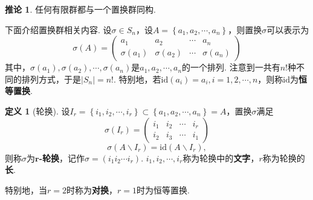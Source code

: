 \documentclass[12pt]{ctexart}
\theoremstyle{definition}
\newtheorem{definition}{定义}
\newtheorem{corollary}{推论}
\theoremstyle{plain}
\newcommand{\id}{\mathrm{id}}
\begin{document}
	\begin{corollary}
		任何有限群都与一个置换群同构.
	\end{corollary}
	下面介绍置换群相关内容. 设$\sigma\in S_n$，设$A=\left\{a_1,a_2,\cdots,a_n\right\}$，则置换$\sigma$可以表示为
	$$\sigma(A)=
	\begin{pmatrix}
		a_1 & a_2 & \cdots & a_n \\
		\sigma(a_1) & \sigma(a_2) & \cdots & \sigma(a_n)
	\end{pmatrix}
	$$
	其中，$\sigma(a_1),\sigma(a_2),\cdots,\sigma(a_n)$是$a_1,a_2,\cdots,a_n$的一个排列. 注意到一共有$n!$种不同的排列方式，于是$|S_n|=n!$. 特别地，若$\id(a_i)=a_i,i=1,2,\cdots,n$，则称$\id$为\textbf{恒等置换}.
	\begin{definition}[轮换]
		设$I_r=\left\{i_1,i_2,\cdots,i_r\right\}\subset\left\{a_1,a_2,\cdots,a_n\right\}=A$，置换$\sigma$满足
		$$\sigma(I_r)=
		\begin{pmatrix}
			i_1 & i_2 & \cdots & i_r \\
			i_2 & i_3 & \cdots & i_1
		\end{pmatrix}
		$$
		$$\sigma(A\backslash I_r)=\id(A\backslash I_r),$$
		则称$\sigma$为$\boldsymbol{r}$\textbf{-轮换}，记作$\sigma=(i_1i_2\cdots i_r)$. $i_1,i_2,\cdots,i_r$称为轮换中的\textbf{文字}，$r$称为轮换的\textbf{长}.
	\end{definition}
	特别地，当$r=2$时称为\textbf{对换}，$r=1$时为恒等置换.
	
\end{document}
